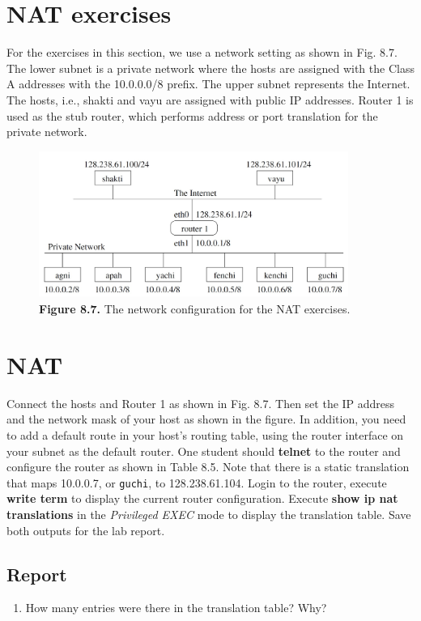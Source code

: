 \documentclass[10pt,a4paper]{article}
\numberwithin{equation}{section}
\numberwithin{figure}{section}
\numberwithin{table}{section}
\begin{document}
\section*{NAT exercises}
    For the exercises in this section, we use a network setting as shown in Fig. 8.7. The lower subnet is a private network where the hosts are assigned with the Class A addresses with the 10.0.0.0/8 prefix. The upper subnet represents the Internet. The hosts, i.e., shakti and vayu are assigned with public IP addresses. Router 1 is used as the stub router, which performs address or port translation for the private network.
    \begin{figure}[H]
        \centering
        \includegraphics[width=0.9\textwidth]{img/fig1.png}
        \caption{\textbf{Figure 8.7.} The network configuration for the NAT exercises.}
        \label{fig:8.7}
    \end{figure}

\section{NAT}
    Connect the hosts and Router 1 as shown in Fig.
    8.7. Then set the IP address and the network mask of your host as shown in the figure.
    In addition, you need to add a default route in your host’s routing table, using the router interface on your subnet as the default router.
    One student should \textbf{telnet} to the router and configure the router as shown in Table 8.5. Note that there is a static translation that maps 10.0.0.7, or \texttt{guchi}, to 128.238.61.104.
    Login to the router, execute \textbf{write term} to display the current router configuration.
    Execute \textbf{show ip nat translations} in the \textit{Privileged EXEC} mode to display the translation table.
    Save both outputs for the lab report.\\
    \subsection*{Report}
    \begin{enumerate}
        \item How many entries were there in the translation table? Why?
    \end{enumerate}
    
\end{document}
